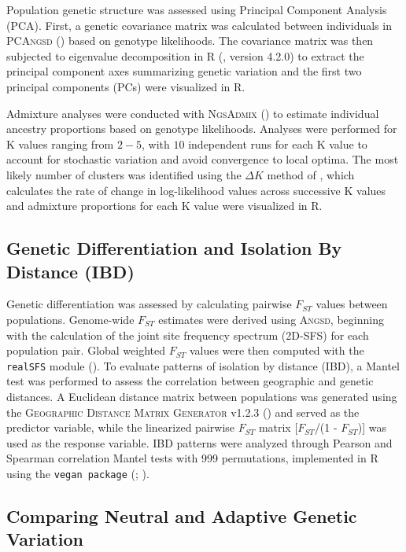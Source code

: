 \documentclass[9pt,a4paper,twoside]{rho-class/rho}
\begin{document}
        Population genetic structure was assessed using Principal Component Analysis (PCA). First, a genetic covariance matrix was calculated between individuals in \textsc{PCAngsd} (\cite{Meisner2018}) based on genotype likelihoods. The covariance matrix was then subjected to eigenvalue decomposition in R (\cite{R2024}, version 4.2.0) to extract the principal component axes summarizing genetic variation and the first two principal components (PCs) were visualized in R.
       
        Admixture analyses were conducted with \textsc{NgsAdmix} (\cite{Skotte2013}) to estimate individual ancestry proportions based on genotype likelihoods. Analyses were performed for K values ranging from $2-5$, with $10$ independent runs for each K value to account for stochastic variation and avoid convergence to local optima. The most likely number of clusters was identified using the $\Delta{K}$ method of \cite{Evanno2005}, which calculates the rate of change in log-likelihood values across successive K values and admixture proportions for each K value were visualized in R.

    \subsection{Genetic Differentiation and Isolation By Distance (IBD)}

        Genetic differentiation was assessed by calculating pairwise $F_{ST}$ values between populations. Genome-wide $F_{ST}$ estimates were derived using \textsc{Angsd}, beginning with the calculation of the joint site frequency spectrum (2D-SFS) for each population pair. Global weighted $F_{ST}$ values were then computed with the \texttt{realSFS} module (\cite{Nielsen2012}). To evaluate patterns of isolation by distance (IBD), a Mantel test was performed to assess the correlation between geographic and genetic distances. A Euclidean distance matrix between populations was generated using the \textsc{Geographic Distance Matrix Generator} v1.2.3 (\Cite{Ersts2024}) and served as the predictor variable, while the linearized pairwise $F_{ST}$ matrix [$F_{ST}$/(1 - $F_{ST}$)] was used as the response variable. IBD patterns were analyzed through Pearson and Spearman correlation Mantel tests with 999 permutations, implemented in R using the \texttt{vegan package} (\cite{Oksanen2001}; \cite{Mantel1967}).
 
    \subsection{Comparing Neutral and Adaptive Genetic Variation}
\end{document}
